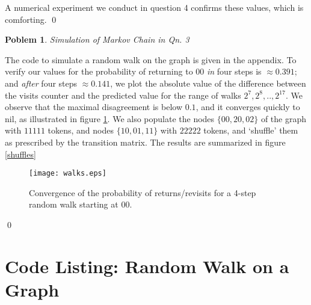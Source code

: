 \documentclass[8pt,notitlepage]{report}
\newtheorem{problem}{Poblem}
\newenvironment{solution}[1][Solution]{\begin{trivlist}
    \item[\hskip \labelsep {\bfseries #1}]}{\end{trivlist}}
\begin{document}
\begin{solution}
A numerical experiment we conduct in question 4 confirms these values, which is comforting.
\qed
\end{solution}

\begin{problem}
Simulation of Markov Chain in Qn. 3
\end{problem}

\begin{solution}
The code to simulate a random walk on the graph is given in the appendix.
To verify our values for the probability of returning to $00$ {\it in} four steps is $\approx 0.391$; 
and {\it after} four steps $\approx 0.141$, we plot the absolute value of the difference between the visits counter 
and the predicted value for the range of walks $2^7,2^8,..,2^{17}$. We observe that the maximal disagreement 
is below $0.1$, and it converges quickly to nil, as illustrated in figure \ref{walks}.
We also populate the nodes $\{ 00, 20, 02\}$ of the graph with $11111$ tokens, and nodes $\{ 10,01,11 \}$ with $22222$
tokens, and `shuffle' them as prescribed by the transition matrix. The results are summarized in figure \ref{shuffles}

\begin{figure}[h]
 \texttt{[image: walks.eps]}
 \caption{Convergence of the probability of returns/revisits for a 4-step random walk starting at $00$.
   \label{walks}
  }
\end{figure}

\qed
\end{solution}

\newpage
\appendix
\section*{Code Listing: Random Walk on a Graph}
% 
\end{document}
